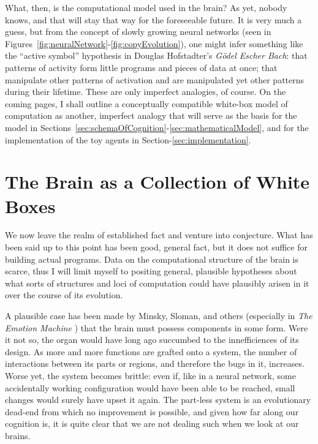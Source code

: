 What, then, is the computational model used in the brain? As yet, nobody knows, and that will stay that way for the foreseeable future. It is very much a guess, but from the concept of slowly growing neural networks (seen in Figures~\ref{fig:neuralNetwork}-\ref{fig:copyEvolution}), one might infer something like the ``active symbol'' hypothesis in Douglas Hofstadter's {\em G\"{o}del Escher Bach}: that patterns of activity form little programs and pieces of data at once; that manipulate other patterns of activation and are manipulated yet other patterns during their lifetime. These are only imperfect analogies, of course. On the coming pages, I shall outline a conceptually compatible white-box model of computation as another, imperfect analogy that will serve as the basis for the model in Sections~\ref{sec:schemaOfCognition}-\ref{sec:mathematicalModel}, and for the implementation of the toy agents in Section-\ref{sec:implementation}.

\section{The Brain as a Collection of White Boxes}\label{sec:whiteBoxModel1}

We now leave the realm of established fact and venture into conjecture. What has been said up to this point has been good, general fact, but it does not suffice for building actual programs. Data on the computational structure of the brain is scarce, thus I will limit myself to positing general, plausible hypotheses about what sorts of structures and loci of computation could have plausibly arisen in it over the course of its evolution. 

A plausible case has been made by Minsky, Sloman, and others (especially in {\em The Emotion Machine} \cite{emotionMachine}) that the brain must possess components in some form. Were it not so, the organ would have long ago succumbed to the innefficiences of its design. As more and more functions are grafted onto a system, the number of interactions between its parts or regions, and therefore the bugs in it, increases. Worse yet, the system becomes brittle: even if, like in a neural network, some accidentally working configuration would have been able to be reached, small changes would surely have upset it again. The part-less system is an evolutionary dead-end from which no improvement is possible, and given how far along our cognition is, it is quite clear that we are not dealing such when we look at our brains.

